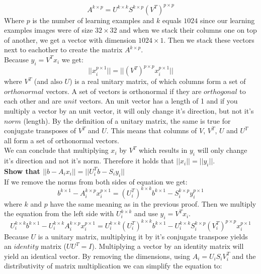 \documentclass[12pt]{article}
\begin{document}
\[
A^{k \times p} = U^{k \times k}S^{k \times p}(V^T)^{p \times p}
\]
\newline
Where $p$ is the number of learning examples and $k$ equals $1024$ since our learning examples images were of size $32 \times 32$ and when we stack their columns one on top of another, we get a vector with dimension $1024 \times 1$. Then we stack these vectors next to eachother to create the matrix $A^{k \times p}$. \\
\newline
Because $y_i = V^Tx_i$ we get:
\newline
\[
 ||x_i^{p \times 1}|| = || (V^T)^{ p \times p} x_i^{p \times 1}||
\]
\newline
where $V^T$ (and also $U$) is a real unitary matrix, of which columns form a set of $orthonormal$ vectors. A set of vectors is orthonormal if they are $orthogonal$ to each other and are $unit$ vectors. An unit vector has a length of 1 and if you multiply a vector by an unit vector, it will only change it's direction, but not it's $norm$ (length). By the definition of a unitary matrix, the same is true for conjugate transposes of $V^T$ and $U$. This means that columns of $V$, $V^T$, $U$ and $U^T$ all form a set of orthonormal vectors. \\
\newline
We can conclude that multiplying $x_i$ by $V^T$ which results in $y_i$ will only change it's direction and not it's norm. Therefore it holds that $||x_i|| = ||y_i||$. \\
\newline
\textbf{Show that $||b - A_ix_i|| = ||U_i^{T}b - S_iy_i||$} \\
If we remove the norms from both sides of equation we get:\\

\[
b^{k \times 1} - A_i^{k \times p} x_i^{p \times 1} = (U_i^{T})^{k \times k}b^{k \times 1} - S_i^{k \times p}y_i^{p \times 1}
\]
\newline
where $k$ and $p$ have the same meaning as in the previous proof. Then we multiply the equation from the left side with $U_i^{k \times k}$ and use $y_i = V^Tx_i$. \\

\[
U_i^{k \times k}b^{k \times 1} - U_i^{k \times k}A_i^{k \times p} x_i^{p \times 1} = U_i^{k \times k}(U_i^{T})^{k \times k}b^{k \times 1} - U_i^{k \times k}S_i^{k \times p}(V_i^{T})^{p \times p}x_i^{p \times 1}
\]
\newline
Because $U$ is a unitary matrix, multiplying it by it's conjugate transpose yields an $identity$ matrix ($UU^T = I$). Multiplying a vector by an identity matrix will yield an identical vector. By removing the dimensions, using $A_i = U_iS_iV_i^{T}$ and the distributivity of matrix multiplication we can simplify the equation to: \\
\end{document}
